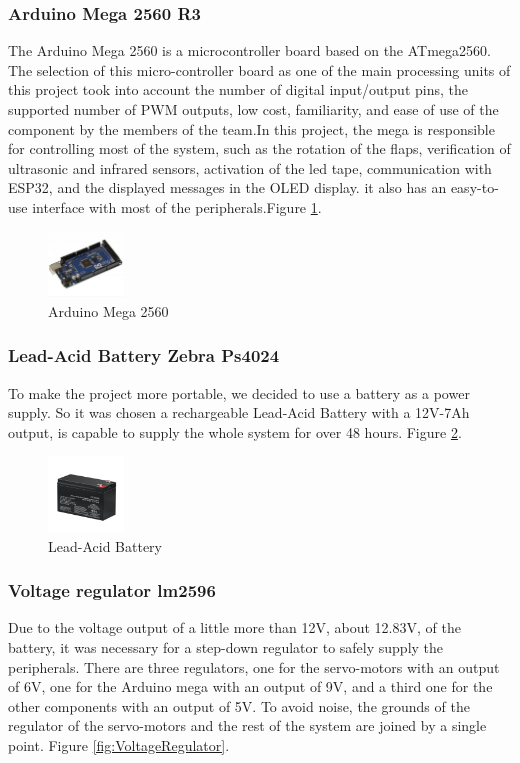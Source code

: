 \documentclass[a4paper,11pt]{article}
\begin{document}
\subsubsection{Arduino Mega 2560 R3}
\label{subsubsec:arduino}
The Arduino Mega 2560 is a microcontroller board based on the ATmega2560. The selection of this micro-controller board as one of the main processing units of this project took into account the number of digital input/output pins, the supported number of PWM outputs, low cost, familiarity, and ease of use of the component by the members of the team\cite{arduino}.In this project, the mega is responsible for controlling most of the system, such as the rotation of the flaps, verification of ultrasonic and infrared sensors, activation of the led tape, communication with ESP32, and the displayed messages in the OLED display. it also has an easy-to-use interface with most of the peripherals.Figure \ref{fig:Arduino}.

\begin{figure}[H]
  \centering
  \includegraphics[width=2cm]{Figures/arduinoMega.jpg}
  \caption{\small{Arduino Mega 2560}}
  \label{fig:Arduino}
\end{figure}

\subsubsection{Lead-Acid Battery Zebra Ps4024}
\label{subsubsec:battery}
To make the project more portable, we decided to use a battery as a power supply. So it was chosen a rechargeable Lead-Acid Battery with a 12V-7Ah output, is capable to supply the whole system for over 48 hours. Figure \ref{fig:Battery}.

\begin{figure}[H]
  \centering
  \includegraphics[width=2cm]{Figures/WDC_Bateria_VRLA_9AH_12V_1200Wx1200H.jpg}
  \caption{\small{Lead-Acid Battery}}
  \label{fig:Battery}
\end{figure}

\subsubsection{Voltage regulator lm2596}
\label{subsubsec:Voltage}
Due to the voltage output of a little more than 12V, about 12.83V, of the battery, it was necessary for a step-down regulator to safely supply the peripherals. There are three regulators, one for the servo-motors with an output of 6V, one for the Arduino mega with an output of 9V, and a third one for the other components with an output of 5V. To avoid noise, the grounds of the regulator of the servo-motors and the rest of the system are joined by a single point. Figure \ref{fig:VoltageRegulator}.
\end{document}
